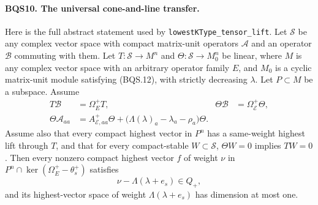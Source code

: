 \paragraph{BQS10. The universal cone-and-line transfer.}
\label{claim:BQS10}
Here is the full abstract statement used by
\texttt{lowestKType\_tensor\_lift}.  Let $\mathcal S$ be any complex
vector space with compact matrix-unit operators $\mathcal A$ and an
operator $\mathcal B$ commuting with them.  Let
$T:\mathcal S\to M^n$ and $\Theta:\mathcal S\to M_0^n$ be linear,
where $M$ is any complex vector space with an arbitrary operator
family $E$, and $M_0$ is a cyclic matrix-unit module satisfying (BQS.12), with strictly
decreasing $\lambda$.  Let $P\subset M$ be a subspace.  Assume
\[
\begin{aligned}
 T\mathcal B&=\Omega^+_E T,&
 \Theta\mathcal B&=\Omega^+_{\mathcal E}\Theta,\\
 \Theta\mathcal A_{aa}
  &=A^+_{\mathcal E,aa}\Theta+
           \bigl(\Lambda(\lambda)_a-\lambda_a-\rho_a\bigr)\Theta.
\end{aligned}
\tag{BQS.30}
\]
Assume also that every compact highest vector in $P^n$ has a
same-weight highest lift through $T$, and that for every compact-stable
$W\subset\mathcal S$, $\Theta W=0$ implies $TW=0$.
Then every nonzero compact highest vector $f$ of weight $\nu$ in
$P^n\cap\ker(\Omega^+_E-\theta_s^+)$ satisfies
\[
                      \nu-\Lambda(\lambda+e_s)\in Q_+,
 \tag{BQS.31}
\]
and its highest-vector space of weight $\Lambda(\lambda+e_s)$
has dimension at most one.

